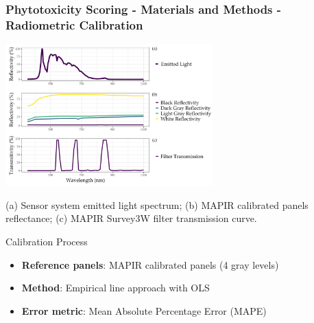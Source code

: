 \documentclass[aspectratio=43]{beamer}
\begin{document}
\begin{frame}
    \frametitle{\small Phytotoxicity Scoring - Materials and Methods - Radiometric Calibration}
    
    \begin{center}
        \includegraphics[width=0.6\textwidth]{Imgs/agronomy-14-00306-g002.png}
    \end{center}
    \tiny (a) Sensor system emitted light spectrum; (b) MAPIR calibrated panels reflectance; (c) MAPIR Survey3W filter transmission curve.
    
    \begin{block}{Calibration Process}
        \scriptsize
        \begin{itemize}
            \item \textbf{Reference panels}: MAPIR calibrated panels (4 gray levels)
            \item \textbf{Method}: Empirical line approach with OLS
            \item \textbf{Error metric}: Mean Absolute Percentage Error (MAPE)
        \end{itemize}
    \end{block}
\end{frame}
\end{document}
